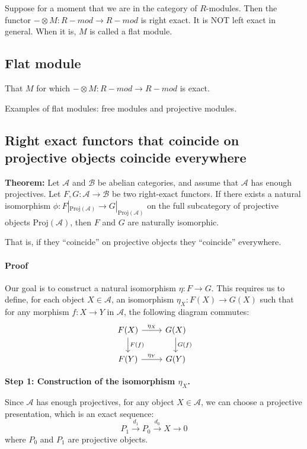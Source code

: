 \documentclass[11pt]{article}
\theoremstyle{definition}
\begin{document}
Suppose for a moment that we are in the category of $R$-modules. Then the functor $- \otimes M : R-mod \to R-mod$ is right exact. It is NOT left exact in general. When it is, $M$ is called a flat module.

\subsection{Flat module}

That $M$ for which  $- \otimes M : R-mod \to R-mod$ is exact.

Examples of flat modules: free modules and projective modules.



\subsection{Right exact functors that coincide on projective objects coincide everywhere}


\textbf{Theorem:} Let $\mathcal{A}$ and $\mathcal{B}$ be abelian categories, and assume that $\mathcal{A}$ has enough projectives. Let $F, G: \mathcal{A} \to \mathcal{B}$ be two right-exact functors. If there exists a natural isomorphism $\phi: F|_{\text{Proj}(\mathcal{A})} \to G|_{\text{Proj}(\mathcal{A})}$ on the full subcategory of projective objects $\text{Proj}(\mathcal{A})$, then $F$ and $G$ are naturally isomorphic.


That is, if they ``coincide'' on projective objects they ``coincide'' everywhere.



\paragraph{Proof}

Our goal is to construct a natural isomorphism $\eta: F \to G$. This requires us to define, for each object $X \in \mathcal{A}$, an isomorphism $\eta_X: F(X) \to G(X)$ such that for any morphism $f: X \to Y$ in $\mathcal{A}$, the following diagram commutes:
\[
\begin{tikzcd}
F(X) \arrow{r}{\eta_X} \arrow{d}{F(f)} & G(X) \arrow{d}{G(f)} \\
F(Y) \arrow{r}{\eta_Y} & G(Y)
\end{tikzcd}
\]

\textbf{Step 1: Construction of the isomorphism $\eta_X$.}

Since $\mathcal{A}$ has enough projectives, for any object $X \in \mathcal{A}$, we can choose a projective presentation, which is an exact sequence:
\[
P_1 \xrightarrow{d_1} P_0 \xrightarrow{d_0} X \to 0
\]
where $P_0$ and $P_1$ are projective objects.
\end{document}
